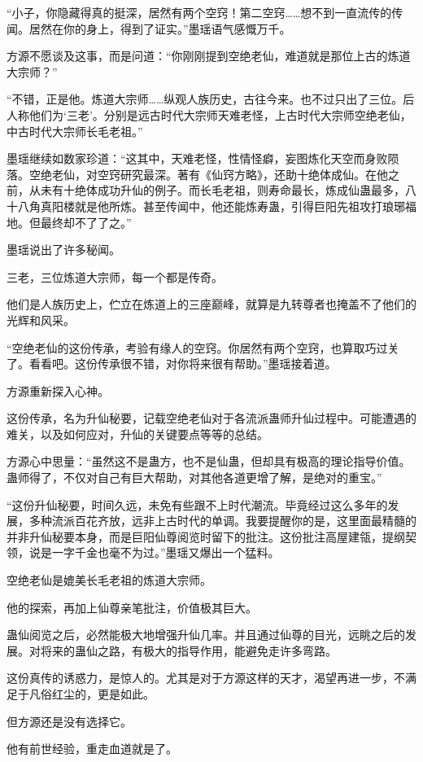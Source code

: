 \begin{this_body}
“小子，你隐藏得真的挺深，居然有两个空窍！第二空窍……想不到一直流传的传闻。居然在你的身上，得到了证实。”墨瑶语气感慨万千。

方源不愿谈及这事，而是问道：“你刚刚提到空绝老仙，难道就是那位上古的炼道大宗师？”

“不错，正是他。炼道大宗师……纵观人族历史，古往今来。也不过只出了三位。后人称他们为‘三老’。分别是远古时代大宗师天难老怪，上古时代大宗师空绝老仙，中古时代大宗师长毛老祖。”

墨瑶继续如数家珍道：“这其中，天难老怪，性情怪癖，妄图炼化天空而身败陨落。空绝老仙，对空窍研究最深。著有《仙窍方略》，还助十绝体成仙。在他之前，从未有十绝体成功升仙的例子。而长毛老祖，则寿命最长，炼成仙蛊最多，八十八角真阳楼就是他所炼。甚至传闻中，他还能炼寿蛊，引得巨阳先祖攻打琅琊福地。但最终却不了了之。”

墨瑶说出了许多秘闻。

三老，三位炼道大宗师，每一个都是传奇。

他们是人族历史上，伫立在炼道上的三座巅峰，就算是九转尊者也掩盖不了他们的光辉和风采。

“空绝老仙的这份传承，考验有缘人的空窍。你居然有两个空窍，也算取巧过关了。看看吧。这份传承很不错，对你将来很有帮助。”墨瑶接着道。

方源重新探入心神。

这份传承，名为升仙秘要，记载空绝老仙对于各流派蛊师升仙过程中。可能遭遇的难关，以及如何应对，升仙的关键要点等等的总结。

方源心中思量：“虽然这不是蛊方，也不是仙蛊，但却具有极高的理论指导价值。蛊师得了，不仅对自己有巨大帮助，对其他各道更增了解，是绝对的重宝。”

“这份升仙秘要，时间久远，未免有些跟不上时代潮流。毕竟经过这么多年的发展，多种流派百花齐放，远非上古时代的单调。我要提醒你的是，这里面最精髓的并非升仙秘要本身，而是巨阳仙尊阅览时留下的批注。这份批注高屋建瓴，提纲契领，说是一字千金也毫不为过。”墨瑶又爆出一个猛料。

空绝老仙是媲美长毛老祖的炼道大宗师。

他的探索，再加上仙尊亲笔批注，价值极其巨大。

蛊仙阅览之后，必然能极大地增强升仙几率。并且通过仙尊的目光，远眺之后的发展。对将来的蛊仙之路，有极大的指导作用，能避免走许多弯路。

这份真传的诱惑力，是惊人的。尤其是对于方源这样的天才，渴望再进一步，不满足于凡俗红尘的，更是如此。

但方源还是没有选择它。

他有前世经验，重走血道就是了。


\end{this_body}
